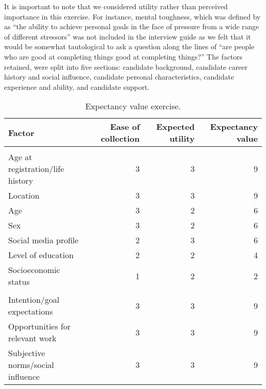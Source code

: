 \documentclass[
  12pt,
  a4paper,
]{book}
\begin{document}
It is important to note that we considered utility rather than perceived importance in this exercise. For instance, mental toughness, which was defined by \citet{Bell2013} as ``the ability to achieve personal goals in the face of pressure from a wide range of different stressors'' was not included in the interview guide as we felt that it would be somewhat tautological to ask a question along the lines of ``are people who are good at completing things good at completing things?'' The factors retained, were split into five sections: candidate background, candidate career history and social influence, candidate personal characteristics, candidate experience and ability, and candidate support.

\begin{table}

\caption{\label{tab:expectancy-value-table}Expectancy value exercise.}
\centering
\fontsize{10}{12}\selectfont
\begin{tabular}[t]{lrrr}
\toprule
Factor & Ease of collection & Expected utility & Expectancy value\\
\midrule
\addlinespace[0.3em]
\multicolumn{4}{l}{\textbf{Candidate background}}\\
\hspace{1em}Age at registration/life history & 3 & 3 & 9\\
\hspace{1em}Location & 3 & 3 & 9\\
\hspace{1em}Age & 3 & 2 & 6\\
\hspace{1em}Sex & 3 & 2 & 6\\
\hspace{1em}Social media profile & 2 & 3 & 6\\
\hspace{1em}Level of education & 2 & 2 & 4\\
\hspace{1em}Socioeconomic status & 1 & 2 & 2\\
\addlinespace[0.3em]
\multicolumn{4}{l}{\textbf{Candidate career history and social influence}}\\
\hspace{1em}Intention/goal expectations & 3 & 3 & 9\\
\hspace{1em}Opportunities for relevant work & 3 & 3 & 9\\
\hspace{1em}Subjective norms/social influence & 3 & 3 & 9\\

\end{tabular}
\end{table}
\end{document}
